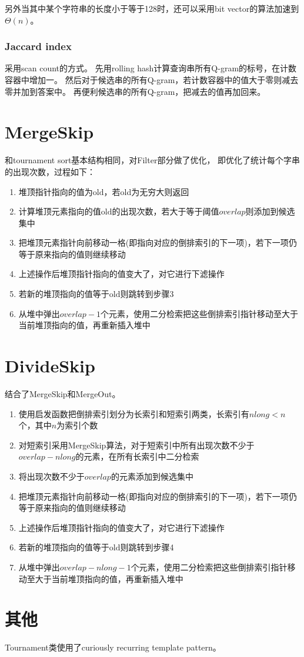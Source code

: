 另外当其中某个字符串的长度小于等于128时，还可以采用bit vector的算法\cite{edit03}加速到$\Theta(n) $。

\subsubsection{Jaccard index}

采用scan count的方式。
先用rolling hash计算查询串所有Q-gram的标号，在计数容器中增加一。
然后对于候选串的所有Q-gram，若计数容器中的值大于零则减去零并加到答案中。
再便利候选串的所有Q-gram，把减去的值再加回来。

\section{MergeSkip}

和tournament sort基本结构相同，对Filter部分做了优化，
即优化了统计每个字串的出现次数，过程如下：

\begin{enumerate}
  \item 堆顶指针指向的值为$\mathrm{old}$，若old为无穷大则返回
  \item 计算堆顶元素指向的值$\mathrm{old}$的出现次数，若大于等于阈值$\mathit{overlap}$则添加到候选集中
  \item 把堆顶元素指针向前移动一格(即指向对应的倒排索引的下一项)，若下一项仍等于原来指向的值则继续移动
  \item 上述操作后堆顶指针指向的值变大了，对它进行下滤操作
  \item 若新的堆顶指向的值等于$\mathrm{old}$则跳转到步骤3
  \item 从堆中弹出$\mathit{overlap}-1$个元素，使用二分检索把这些倒排索引指针移动至大于当前堆顶指向的值，再重新插入堆中
\end{enumerate}

\section{DivideSkip}

结合了MergeSkip和MergeOut。

\begin{enumerate}
  \item 使用启发函数把倒排索引划分为长索引和短索引两类，长索引有$\mathit{nlong}<\mathit{n}$个，其中$n$为索引个数
  \item 对短索引采用MergeSkip算法，对于短索引中所有出现次数不少于$\mathit{overlap}-\mathit{nlong}$的元素，在所有长索引中二分检索
  \item 将出现次数不少于$\mathit{overlap}$的元素添加到候选集中
  \item 把堆顶元素指针向前移动一格(即指向对应的倒排索引的下一项)，若下一项仍等于原来指向的值则继续移动
  \item 上述操作后堆顶指针指向的值变大了，对它进行下滤操作
  \item 若新的堆顶指向的值等于$\mathrm{old}$则跳转到步骤4
  \item 从堆中弹出$\mathit{overlap}-\mathit{nlong}-1$个元素，使用二分检索把这些倒排索引指针移动至大于当前堆顶指向的值，再重新插入堆中
\end{enumerate}

\section{其他}

Tournament类使用了curiously recurring template pattern。

\printbibliography
